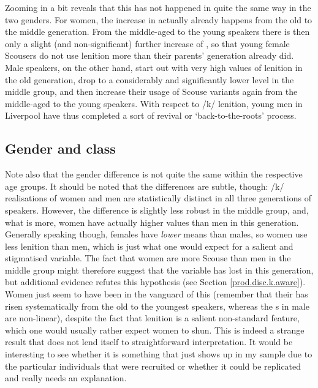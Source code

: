 Zooming in a bit reveals that this  has not happened in quite the same way in the two genders.
For women, the increase in  actually already happens from the old to the middle generation.
From the middle-aged to the young speakers there is then only a slight (and non-significant) further increase of , so that young female Scousers do not use lenition more than their parents' generation already did.
Male speakers, on the other hand, start out with very high values of lenition in the old generation, drop to a considerably and significantly lower level in the middle group, and then increase their usage of Scouse variants again from the middle-aged to the young speakers.
With respect to /k/ lenition, young men in Liverpool have thus completed a sort of revival or `back-to-the-roots' process.

\subsection{Gender and class}
\label{prod.disc.k.social}

Note also that the gender difference is not quite the same within the respective age groups.
It should be noted that the differences are subtle, though: /k/ realisations of women and men are statistically distinct in all three generations of speakers.
However, the difference is slightly less robust in the middle group, and, what is more, women have actually higher  values than men in this generation.
Generally speaking though, females have \emph{lower}  means than males, so women use less lenition than men, which is just what one would expect for a salient and stigmatised variable.
The fact that women are more Scouse than men in the middle group might therefore suggest that the variable has lost  in this generation, but additional evidence refutes this hypothesis (see Section \ref{prod.disc.k.aware}).
Women just seem to have been in the vanguard of this  (remember that their  has risen systematically from the old to the youngest speakers, whereas the s in male  are non-linear), despite the fact that lenition is a salient non-standard feature, which one would usually rather expect women to shun.
This is indeed a strange result that does not lend itself to straightforward interpretation.
It would be interesting to see whether it is something that just shows up in my sample due to the particular individuals that were recruited or whether it could be replicated and really needs an explanation.

